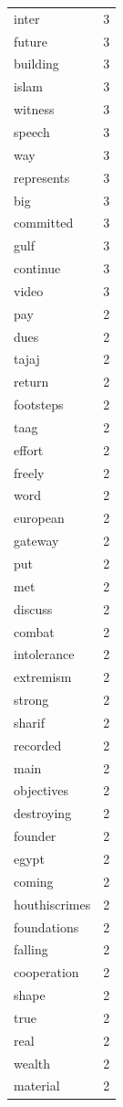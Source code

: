 \begin{tabular}{lr}
inter & 3 \\
future & 3 \\
building & 3 \\
islam & 3 \\
witness & 3 \\
speech & 3 \\
way & 3 \\
represents & 3 \\
big & 3 \\
committed & 3 \\
gulf & 3 \\
continue & 3 \\
video & 3 \\
pay & 2 \\
dues & 2 \\
tajaj & 2 \\
return & 2 \\
footsteps & 2 \\
taag & 2 \\
effort & 2 \\
freely & 2 \\
word & 2 \\
european & 2 \\
gateway & 2 \\
put & 2 \\
met & 2 \\
discuss & 2 \\
combat & 2 \\
intolerance & 2 \\
extremism & 2 \\
strong & 2 \\
sharif & 2 \\
recorded & 2 \\
main & 2 \\
objectives & 2 \\
destroying & 2 \\
founder & 2 \\
egypt & 2 \\
coming & 2 \\
houthiscrimes & 2 \\
foundations & 2 \\
falling & 2 \\
cooperation & 2 \\
shape & 2 \\
true & 2 \\
real & 2 \\
wealth & 2 \\
material & 2 \\

\end{tabular}
